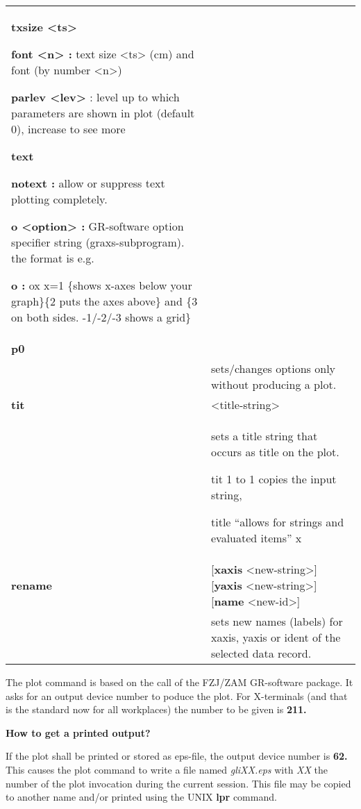 \documentclass[]{article}
\begin{document}
\begin{longtable}[]{@{}ll@{}}
\begin{minipage}[t]{0.47\columnwidth}
\textbf{txsize \textless{}ts\textgreater{}}

\textbf{font \textless{}n\textgreater{} :} text size
\textless{}ts\textgreater{} (cm) and font (by number
\textless{}n\textgreater{})

\textbf{parlev \textless{}lev\textgreater{}} : level up to which
parameters are shown in plot (default 0), increase to see more

\textbf{text}

\textbf{notext :} allow or suppress text plotting completely.

\textbf{o \textless{}option\textgreater{} :} GR-software option
specifier string (graxs-subprogram). the format is e.g.

\textbf{o :} ox x=1 \{shows x-axes below your graph\}\{2 puts the axes
above\} and \{3 on both sides. -1/-2/-3 shows a grid\}\strut
\end{minipage}\tabularnewline
\textbf{p0} &\tabularnewline
& sets/changes options only without producing a plot.\tabularnewline
\textbf{tit} & \textless{}title-string\textgreater{}\tabularnewline
\begin{minipage}[t]{0.47\columnwidth}\raggedright
\strut
\end{minipage} & \begin{minipage}[t]{0.47\columnwidth}\raggedright
sets a title string that occurs as title on the plot.

tit 1 to 1 copies the input string,

title ``allows for strings and evaluated items'' x\strut
\end{minipage}\tabularnewline
\textbf{rename} & {[}\textbf{xaxis}
\textless{}new-string\textgreater{}{]} {[}\textbf{yaxis}
\textless{}new-string\textgreater{}{]} {[}\textbf{name}
\textless{}new-id\textgreater{}{]}\tabularnewline
& sets new names (labels) for xaxis, yaxis or ident of the selected data
record.\tabularnewline
\bottomrule
\end{longtable}

The plot command is based on the call of the FZJ/ZAM GR-software
package. It asks for an output device number to poduce the plot. For
X-terminals (and that is the standard now for all workplaces) the number
to be given is \textbf{211.}

\textbf{How to get a printed output?}

If the plot shall be printed or stored as eps-file, the output device
number is \textbf{62.} This causes the plot command to write a file
named \emph{gliXX.eps} with \emph{XX} the number of the plot invocation
during the current session. This file may be copied to another name
and/or printed using the UNIX \textbf{lpr} command.
\end{document}
